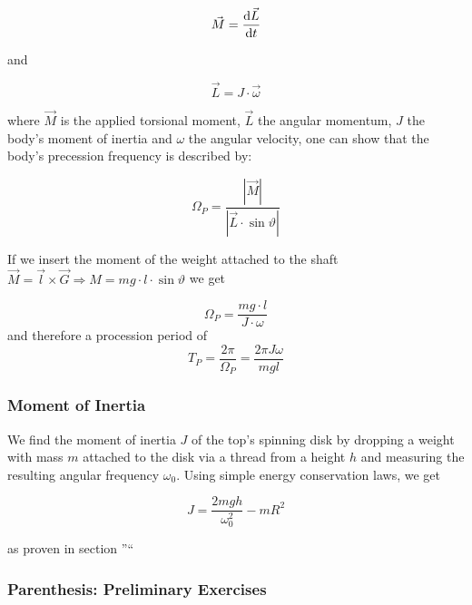 \documentclass{scrreprt}
\begin{document}
\begin{equation}
\vec{M} = \frac{\dif \vec{L}}{\dif t}
\end{equation}

and

\begin{equation}
\vec{L} = J \cdot \vec{\omega}
\end{equation}

where $\vec{M}$ is the applied torsional moment, $\vec{L}$ the angular momentum, $J$ the body's moment of inertia and $\omega$ the angular velocity, one can show that the body's precession frequency is described by:

\begin{equation}
\Omega_P = \frac{|\vec{M}|}{|\vec{L}\cdot \sin \vartheta|}
\end{equation}

If we insert the moment of the weight attached to the shaft $\vec{M} = \vec{l} \times \vec{G} \Rightarrow M = m g \cdot l \cdot \sin \vartheta$ we get

\begin{equation}
\Omega_P = \frac{mg\cdot l}{J\cdot \omega}
\end{equation}
and therefore a procession period of
\begin{equation}
T_P = \frac{2\pi}{\Omega_P} = \frac{2\pi J \omega}{mgl}
\end{equation}

\subsubsection{Moment of Inertia}

We find the moment of inertia $J$ of the top's spinning disk by dropping a weight with mass $m$ attached to the disk via a thread from a height $h$ and measuring the resulting angular frequency $\omega_0$. Using simple energy conservation laws, we get

\begin{equation}
\label{eq:inertia}
J = \frac{2mgh}{\omega_0^2} - m R^2
\end{equation}

as proven in section ''``

\subsubsection{Parenthesis: Preliminary Exercises}
\label{sec:preliminary_exercises}
\end{document}

